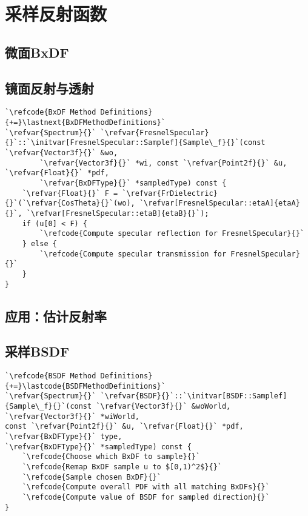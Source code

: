 \section{采样反射函数}\label{sec:采样反射函数}

\subsection{微面BxDF}\label{sub:微面BxDF}
\subsection{镜面反射与透射}\label{sub:镜面反射与透射}
\begin{lstlisting}
`\refcode{BxDF Method Definitions}{+=}\lastnext{BxDFMethodDefinitions}`
`\refvar{Spectrum}{}` `\refvar{FresnelSpecular}{}`::`\initvar[FresnelSpecular::Samplef]{Sample\_f}{}`(const `\refvar{Vector3f}{}` &wo,
        `\refvar{Vector3f}{}` *wi, const `\refvar{Point2f}{}` &u, `\refvar{Float}{}` *pdf,
        `\refvar{BxDFType}{}` *sampledType) const {
    `\refvar{Float}{}` F = `\refvar{FrDielectric}{}`(`\refvar{CosTheta}{}`(wo), `\refvar[FresnelSpecular::etaA]{etaA}{}`, `\refvar[FresnelSpecular::etaB]{etaB}{}`);
    if (u[0] < F) {
        `\refcode{Compute specular reflection for FresnelSpecular}{}`
    } else {
        `\refcode{Compute specular transmission for FresnelSpecular}{}`
    }
}
\end{lstlisting}
\subsection{应用：估计反射率}\label{sub:应用：估计反射率}
\subsection{采样BSDF}\label{sub:采样BSDF}
\begin{lstlisting}
`\refcode{BSDF Method Definitions}{+=}\lastcode{BSDFMethodDefinitions}`
`\refvar{Spectrum}{}` `\refvar{BSDF}{}`::`\initvar[BSDF::Samplef]{Sample\_f}{}`(const `\refvar{Vector3f}{}` &woWorld, `\refvar{Vector3f}{}` *wiWorld,
const `\refvar{Point2f}{}` &u, `\refvar{Float}{}` *pdf, `\refvar{BxDFType}{}` type,
`\refvar{BxDFType}{}` *sampledType) const {
    `\refcode{Choose which BxDF to sample}{}`
    `\refcode{Remap BxDF sample u to $[0,1)^2$}{}`
    `\refcode{Sample chosen BxDF}{}`
    `\refcode{Compute overall PDF with all matching BxDFs}{}`
    `\refcode{Compute value of BSDF for sampled direction}{}`
}
\end{lstlisting}
